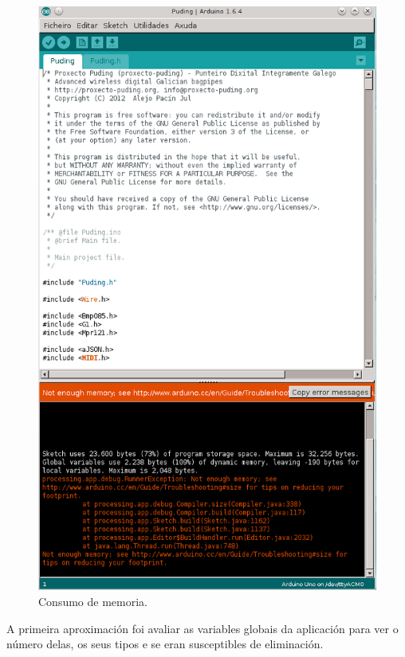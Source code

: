    \begin{figure}[htbp]
    \centering
    \includegraphics[scale=0.6,keepaspectratio=true]{./imagenes/consumo-memoria.png}
    \caption{Consumo de memoria.}
    \label{figura:ConsumoMemoria}
   \end{figure}
   
   A primeira aproximación foi avaliar as variables globais da aplicación para
   ver o número delas, os seus tipos e se eran susceptibles de eliminación. \\
   
